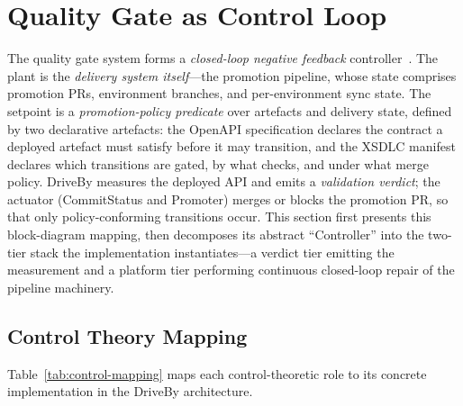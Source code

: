 \section{Quality Gate as Control Loop}
\label{sec:control-loop}

The quality gate system forms a \textit{closed-loop negative feedback} controller~\cite{astrom-feedback}. The plant is the \textit{delivery system itself}---the promotion pipeline, whose state comprises promotion PRs, environment branches, and per-environment sync state. The setpoint is a \textit{promotion-policy predicate} over artefacts and delivery state, defined by two declarative artefacts: the OpenAPI specification declares the contract a deployed artefact must satisfy before it may transition, and the XSDLC manifest declares which transitions are gated, by what checks, and under what merge policy. DriveBy measures the deployed API and emits a \textit{validation verdict}; the actuator (CommitStatus and Promoter) merges or blocks the promotion PR, so that only policy-conforming transitions occur. This section first presents this block-diagram mapping, then decomposes its abstract ``Controller'' into the two-tier stack the implementation instantiates---a verdict tier emitting the measurement and a platform tier performing continuous closed-loop repair of the pipeline machinery.

\subsection{Control Theory Mapping}
\label{subsec:control-mapping}

Table~\ref{tab:control-mapping} maps each control-theoretic role to its concrete implementation in the DriveBy architecture.


